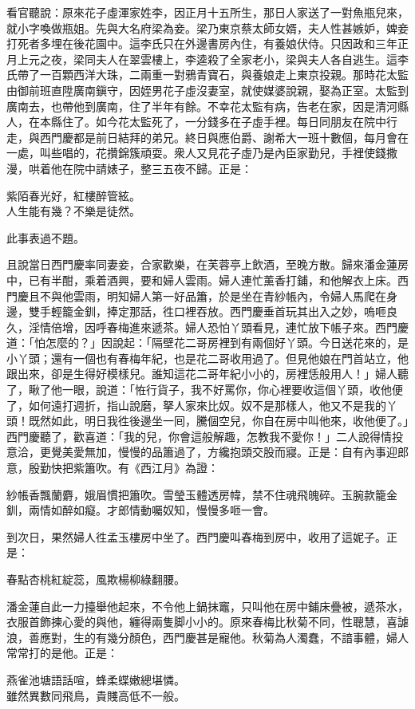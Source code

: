 看官聽說：原來花子虛渾家姓李，因正月十五所生，那日人家送了一對魚瓶兒來，就小字喚做瓶姐。先與大名府梁為妾。梁乃東京蔡太師女婿，夫人性甚嫉妒，婢妾打死者多埋在後花園中。這李氏只在外邊書房內住，有養娘伏侍。只因政和三年正月上元之夜，梁同夫人在翠雲樓上，李逵殺了全家老小，{}梁與夫人各自逃生。這李氏帶了一百顆西洋大珠，{}二兩重一對鴉青寶石，與養娘走上東京投親。那時花太監由御前班直陞廣南鎭守，因姪男花子虛沒妻室，就使媒婆說親，娶為正室。太監到廣南去，也帶他到廣南，住了半年有餘。不幸花太監有病，告老在家，因是清河縣人，在本縣住了。如今花太監死了，一分錢多在子虛手裡。每日同朋友在院中行走，與西門慶都是前日結拜的弟兄。終日與應伯爵、謝希大一班十數個，每月會在一處，叫些唱的，花攢錦簇頑耍。衆人又見花子虛乃是內臣家勤兒，手裡使錢撒漫，哄着他在院中請婊子，整三五夜不歸。正是：

\begin{myquote}
紫陌春光好，紅樓醉管絃。\\人生能有幾？不樂是徒然。
\end{myquote}

此事表過不題。

且說當日西門慶率同妻妾，合家歡樂，在芙蓉亭上飲酒，至晚方散。歸來潘金蓮房中，已有半酣，乘着酒興，要和婦人雲雨。婦人連忙薰香打鋪，和他解衣上床。西門慶且不與他雲雨，明知婦人第一好品簫，於是坐在青紗帳內，令婦人馬爬在身邊，雙手輕籠金釧，捧定那話，徃口裡吞放。西門慶垂首玩其出入之妙，嗚咂良久，淫情倍增，因呼春梅進來遞茶。{}婦人恐怕丫頭看見，連忙放下帳子來。西門慶道：「怕怎麼的？」因說起：「隔壁花二哥房裡到有兩個好丫頭。今日送花來的，是小丫頭；還有一個也有春梅年紀，也是花二哥收用過了。但見他娘在門首站立，{}他跟出來，卻是生得好模樣兒。誰知這花二哥年紀小小的，房裡恁般用人！」{}婦人聽了，瞅了他一眼，說道：「恠行貨子，我不好罵你，你心裡要收這個丫頭，{}收他便了，如何遠打週折，指山說磨，拏人家來比奴。奴不是那樣人，他又不是我的丫頭！既然如此，明日我徃後邊坐一囘，騰個空兒，你自在房中叫他來，收他便了。」{}西門慶聽了，歡喜道：「我的兒，你會這般解趣，怎教我不愛你！」二人說得情投意洽，更覺美愛無加，慢慢的品簫過了，方纔抱頭交股而寢。正是：自有內事迎郎意，殷勤快把紫簫吹。有《西江月》為證：

\begin{myquote}
紗帳香飄蘭麝，娥眉慣把簫吹。雪瑩玉體透房幃，禁不住魂飛魄碎。玉腕款籠金釧，兩情如醉如癡。才郎情動囑奴知，慢慢多咂一會。
\end{myquote}

到次日，果然婦人徃孟玉樓房中坐了。西門慶叫春梅到房中，收用了這妮子。正是：

\begin{myquote}
春點杏桃紅綻蕊，風欺楊柳綠翻腰。
\end{myquote}

潘金蓮自此一力擡舉他起來，不令他上鍋抹竈，只叫他在房中鋪床疊被，遞茶水，衣服首飾揀心愛的與他，纏得兩隻脚小小的。原來春梅比秋菊不同，性聰慧，喜謔浪，善應對，生的有幾分顏色，西門慶甚是寵他。秋菊為人濁蠢，不諳事體，婦人常常打的是他。正是：

\begin{myquote}
燕雀池塘語話喧，蜂柔蝶嫩總堪憐。\\雖然異數同飛鳥，貴賤高低不一般。
\end{myquote}

